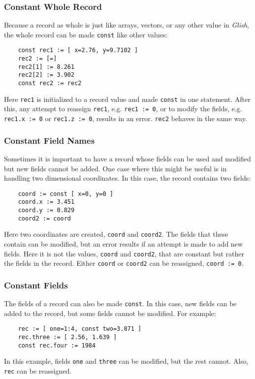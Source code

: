 \subsubsection{Constant Whole Record}
Because a  record as whole is just like arrays, vectors, or any other value in
{\em Glish},
the whole record can be made {\tt const} like other values:
\begin{verbatim}
    const rec1 := [ x=2.76, y=9.7102 ]
    rec2 := [=]
    rec2[1] := 8.261
    rec2[2] := 3.902
    const rec2 := rec2
\end{verbatim}
Here {\tt rec1} is initialized to a record value and made {\tt const} in one
statement. After this, any attempt
to reassign {\tt rec1}, e.g. \verb+rec1 := 0+, or to modify the fields,
e.g. \verb+rec1.x := 0+ or \verb+rec1.z := 0+, results in an error.
{\tt rec2} behaves in the same way.

\subsubsection{Constant Field Names}
Sometimes it is important to have a record whose fields can be used
and modified but new fields cannot be added. One case where
this might be useful is in handling two dimensional coordinates. In
this case, the record contains two fields:
\begin{verbatim}
    coord := const [ x=0, y=0 ]
    coord.x := 3.451
    coord.y := 0.829
    coord2 := coord
\end{verbatim}
Here two coordinates are created, {\tt coord} and {\tt coord2}. The
fields that these contain can be modified, but an error results if
an attempt is made to add new fields. Here it is not the values,
{\tt coord} and {\tt coord2}, that are constant but rather the
fields in the record. Either {\tt coord} or {\tt coord2} can
be reassigned, \verb+coord := 0+.

\subsubsection{Constant Fields}
The fields of a record can also be made {\tt const}. In this case,
new fields can be added to the record, but some fields cannot be
modified. For example:
\begin{verbatim}
    rec := [ one=1:4, const two=3.871 ]
    rec.three := [ 2.56, 1.639 ]
    const rec.four := 1984
\end{verbatim}
In this example, fields {\tt one} and {\tt three} can be modified,
but the rest cannot. Also, {\tt rec} can be reassigned.

